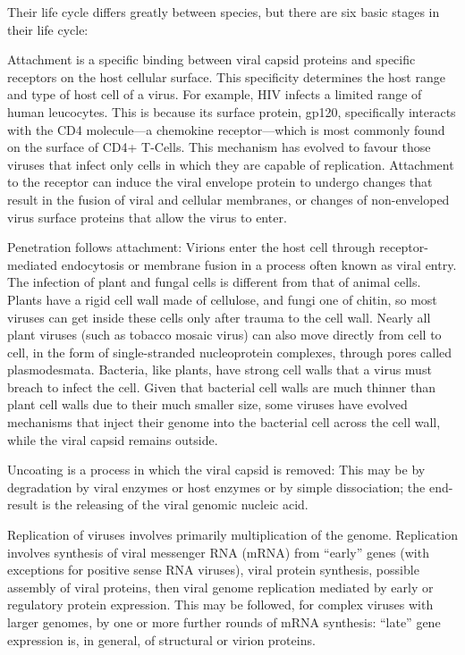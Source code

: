 Their life cycle differs greatly between species, but there are six basic stages in their life cycle:

Attachment is a specific binding between viral capsid proteins and specific receptors on the host cellular surface. This specificity determines the host range and type of host cell of a virus. For example, HIV infects a limited range of human leucocytes. This is because its surface protein, gp120, specifically interacts with the CD4 molecule---a chemokine receptor---which is most commonly found on the surface of CD4+ T-Cells. This mechanism has evolved to favour those viruses that infect only cells in which they are capable of replication. Attachment to the receptor can induce the viral envelope protein to undergo changes that result in the fusion of viral and cellular membranes, or changes of non-enveloped virus surface proteins that allow the virus to enter.

Penetration follows attachment: Virions enter the host cell through receptor-mediated endocytosis or membrane fusion in a process often known as viral entry. The infection of plant and fungal cells is different from that of animal cells. Plants have a rigid cell wall made of cellulose, and fungi one of chitin, so most viruses can get inside these cells only after trauma to the cell wall. Nearly all plant viruses (such as tobacco mosaic virus) can also move directly from cell to cell, in the form of single-stranded nucleoprotein complexes, through pores called plasmodesmata. Bacteria, like plants, have strong cell walls that a virus must breach to infect the cell. Given that bacterial cell walls are much thinner than plant cell walls due to their much smaller size, some viruses have evolved mechanisms that inject their genome into the bacterial cell across the cell wall, while the viral capsid remains outside.

Uncoating is a process in which the viral capsid is removed: This may be by degradation by viral enzymes or host enzymes or by simple dissociation; the end-result is the releasing of the viral genomic nucleic acid.

Replication of viruses involves primarily multiplication of the genome. Replication involves synthesis of viral messenger RNA (mRNA) from ``early'' genes (with exceptions for positive sense RNA viruses), viral protein synthesis, possible assembly of viral proteins, then viral genome replication mediated by early or regulatory protein expression. This may be followed, for complex viruses with larger genomes, by one or more further rounds of mRNA synthesis: ``late'' gene expression is, in general, of structural or virion proteins.

